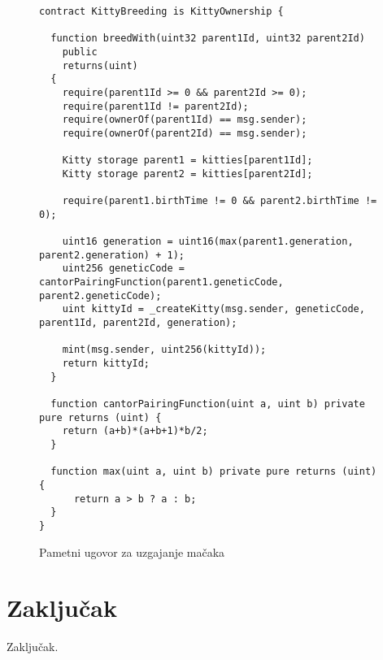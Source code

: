 \documentclass[times, utf8, tehnicka_dokumentacija]{fer}
\begin{document}
\begin{figure}
\begin{lstlisting}
contract KittyBreeding is KittyOwnership {

  function breedWith(uint32 parent1Id, uint32 parent2Id) 
    public
    returns(uint)
  {
    require(parent1Id >= 0 && parent2Id >= 0);
    require(parent1Id != parent2Id);
    require(ownerOf(parent1Id) == msg.sender);
    require(ownerOf(parent2Id) == msg.sender);

    Kitty storage parent1 = kitties[parent1Id];
    Kitty storage parent2 = kitties[parent2Id];

    require(parent1.birthTime != 0 && parent2.birthTime != 0);

    uint16 generation = uint16(max(parent1.generation, parent2.generation) + 1);
    uint256 geneticCode = cantorPairingFunction(parent1.geneticCode, parent2.geneticCode);
    uint kittyId = _createKitty(msg.sender, geneticCode, parent1Id, parent2Id, generation);

    mint(msg.sender, uint256(kittyId));
    return kittyId;
  }

  function cantorPairingFunction(uint a, uint b) private pure returns (uint) {
    return (a+b)*(a+b+1)*b/2;
  }

  function max(uint a, uint b) private pure returns (uint) {
      return a > b ? a : b;
  }
}
\end{lstlisting}
\caption{Pametni ugovor za uzgajanje mačaka}
\label{lst:kittymarket}
\end{figure}

\chapter{Zaključak}
Zaključak.



\end{document}

